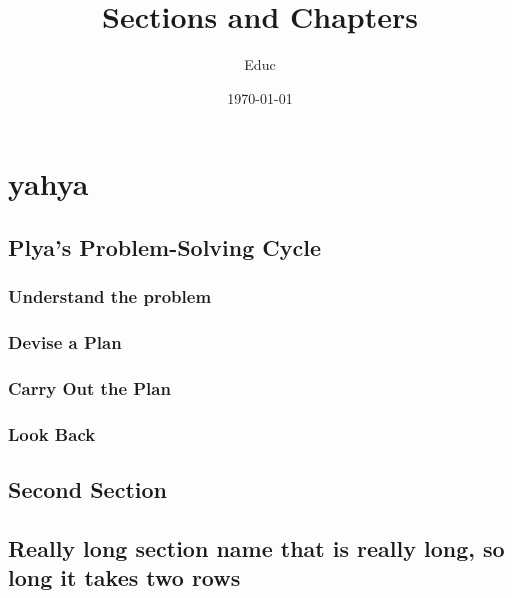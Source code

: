 \documentclass{report}
\title{Sections and Chapters}
\author{Educ}
\date{\today}
\begin{document}
\maketitle

\chapter{yahya}
\section{Plya's Problem-Solving Cycle}
\subsection{Understand the problem}
\subsection{Devise a Plan}
\subsection{Carry Out the Plan}
\subsection{Look Back}
\section{Second Section}

\section
  {Really long section name that is really long, so long it takes two rows}
\end{document}
